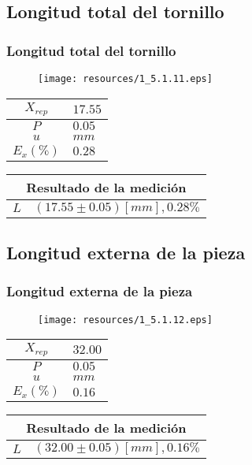\documentclass[letter,11pt]{beamer}
\begin{document}
\subsection{Longitud total del tornillo}
\begin{frame}
\frametitle{Longitud total del tornillo}
\vspace*{0.8cm}
\begin{figure}
\centering
\texttt{[image: resources/1\_5.1.11.eps]}
\end{figure}
\vspace*{0.4cm}
\scriptsize
\begin{tabular}{|c|>{\centering}m{1.8cm}<{\centering}|}
\hline
$X_{rep}$ &  $17.55$ \tabularnewline \hline
      $P$ &   $0.05$ \tabularnewline \hline
      $u$ &     $mm$ \tabularnewline \hline
$E_x(\%)$ &   $0.28$ \tabularnewline \hline
\end{tabular}
\quad
\begin{tabular}{|c|>{\centering}m{5.7cm}<{\centering}|}
\hline
\multicolumn{2}{|c|}{\textbf{Resultado de la medición}} \\ \hline
$L$ & $( 17.55\pm0.05)[mm], 0.28\%$ \tabularnewline \hline
\end{tabular}
\end{frame}

\subsection{Longitud externa de la pieza}
\begin{frame}
\frametitle{Longitud externa de la pieza}
\vspace*{0.8cm}
\begin{figure}
\centering
\texttt{[image: resources/1\_5.1.12.eps]}
\end{figure}
\vspace*{0.4cm}
\scriptsize
\begin{tabular}{|c|>{\centering}m{1.8cm}<{\centering}|}
\hline
$X_{rep}$ &  $32.00$ \tabularnewline \hline
      $P$ &   $0.05$ \tabularnewline \hline
      $u$ &     $mm$ \tabularnewline \hline
$E_x(\%)$ &   $0.16$ \tabularnewline \hline
\end{tabular}
\quad
\begin{tabular}{|c|>{\centering}m{5.7cm}<{\centering}|}
\hline
\multicolumn{2}{|c|}{\textbf{Resultado de la medición}} \\ \hline
$L$ & $( 32.00\pm0.05)[mm], 0.16\%$ \tabularnewline \hline
\end{tabular}
\end{frame}
\end{document}
